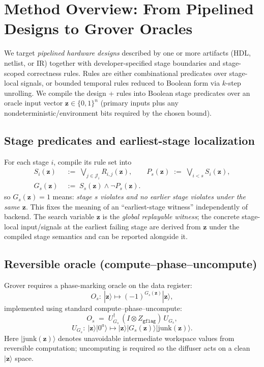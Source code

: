 \documentclass[conference]{IEEEtran}
\newcommand{\zvec}{\mathbf{z}}
\begin{document}
\section{Method Overview: From Pipelined Designs to Grover Oracles}
We target \emph{pipelined hardware designs} described by one or more artifacts (HDL, netlist, or IR) together with
developer-specified stage boundaries and stage-scoped correctness rules.
Rules are either combinational predicates over stage-local signals, or bounded temporal rules reduced to Boolean form
via $k$-step unrolling.\cite{clarke2001bmc,BiereEtAl2009BMCHandbook}
We compile the design + rules into Boolean stage predicates over an oracle input vector
$\zvec\in\{0,1\}^n$ (primary inputs plus any nondeterministic/environment bits required by the chosen bound).

\subsection{Stage predicates and earliest-stage localization}
For each stage $i$, compile its rule set into
\[
\begin{aligned}
S_i(\zvec)\;&:=\;\bigvee_{j\in\mathcal{J}_i} R_{i,j}(\zvec),
\qquad
P_s(\zvec)\;:=\;\bigvee_{i<s} S_i(\zvec),\\
G_s(\zvec)\;&:=\;S_s(\zvec)\wedge \neg P_s(\zvec).
\end{aligned}
\]
so $G_s(\zvec)=1$ means: \emph{stage $s$ violates and no earlier stage violates under the same $\zvec$}.
This fixes the meaning of an “earliest-stage witness” independently of backend.
The search variable $\zvec$ is the \emph{global replayable witness}; the concrete stage-local input/signals at the earliest failing stage are derived from $\zvec$ under the compiled stage semantics and can be reported alongside it.

\subsection{Reversible oracle (compute--phase--uncompute)}
Grover requires a phase-marking oracle on the data register:\cite{grover1996,boyer1998tight,brassard2002amplification,nielsenchuang2010}
\[
O_s:\ |\zvec\rangle \mapsto (-1)^{G_s(\zvec)}|\zvec\rangle,
\]
implemented using standard compute--phase--uncompute:\cite{bennett1973logical,Barenco1995ElementaryGates,nielsenchuang2010}
\[
O_s \;=\; U_{G_s}^{\dagger}\,(I\!\otimes\! Z_{\texttt{gflag}})\,U_{G_s},
\]
\[
U_{G_s}:\ |\zvec\rangle|0^{a}\rangle \mapsto
|\zvec\rangle|G_s(\zvec)\rangle|\mathrm{junk}(\zvec)\rangle .
\]
Here $|\mathrm{junk}(\zvec)\rangle$ denotes unavoidable intermediate workspace values from reversible computation;\cite{bennett1973logical,bennett1989timespace}
uncomputing is required so the diffuser acts on a clean $|\zvec\rangle$ space.\cite{brassard2002amplification,nielsenchuang2010}
\end{document}
